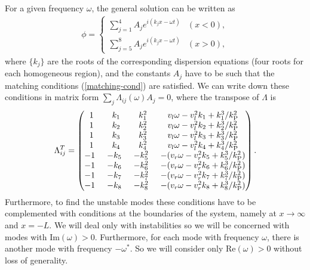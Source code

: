 \documentclass[11pt,a4paper]{article}
\begin{document}
For a given frequency $\omega$, the general solution can be written as
\begin{align}
\phi = \begin{cases}
\displaystyle\sum _{j=1}^4 A_j e^{i(k_jx - \omega t)}& (x<0),\\
\displaystyle\sum _{j=5}^8 A_j e^{i(k_jx - \omega t)}& (x>0),
\end{cases}
\end{align}
where $\{ k_j\}$ are the roots of the corresponding dispersion
equations (four roots for each homogeneous region), and the constants $A_j$
have to be such that the matching conditions
(\ref{matching-cond}) are satisfied. We can write down
these conditions in matrix form $\sum_j\Lambda_{ij}(\omega)A_j=0$, where
the transpose of $\Lambda$ is
\begin{align}
\Lambda_{ij}^T=
\begin{pmatrix}
1 & k_1 & k_1^2 &  v_l\omega-v_l^2 k_1+ k_1^3/k_\text{P}^2
\\
1 & k_2 & k_2^2 & v_l\omega-v_l^2 k_2+ k_2^3/k_\text{P}^2
\\
1 & k_3 & k_3^2 & v_l\omega-v_l^2 k_3+ k_3^3/k_\text{P}^2
\\
1 & k_4 & k_4^2 & v_l\omega-v_l^2 k_4+ k_4^3/k_\text{P}^2
\\
-1\hspace*{1ex}  & -k_5\hspace*{1ex} & -k_5^2\hspace*{1ex} &-(v_r\omega-v_r^2 k_5+ k_5^3/k_\text{P}^2)
\\
-1\hspace*{1ex} & -k_6\hspace*{1ex} & -k_6^2\hspace*{1ex} &-(v_r\omega-v_r^2 k_6+ k_6^3/k_\text{P}^2)
\\
-1\hspace*{1ex} & -k_7\hspace*{1ex} & -k_7^2\hspace*{1ex} & -(v_r\omega-v_r^2 k_7+ k_7^3/k_\text{P}^2)
\\
-1\hspace*{1ex} &-k_8\hspace*{1ex} & -k_8^2\hspace*{1ex} & -(v_r\omega-v_r^2 k_8+ k_8^3/k_\text{P}^2)
\\
\end{pmatrix}.
\label{lambda-matrix}
\end{align}
Furthermore, to find the unstable modes these conditions have to be complemented with
conditions at the boundaries of the system, namely at $x\to\infty$ and $x=-L$. 
We will deal only with instabilities so we will be concerned with modes with $\text{Im}(\omega)>0$. Furthermore, for each mode with frequency $\omega$, there is another mode with frequency $-\omega^*$. So we will consider only $\text{Re}(\omega)>0$ without loss of generality.  
\end{document}

